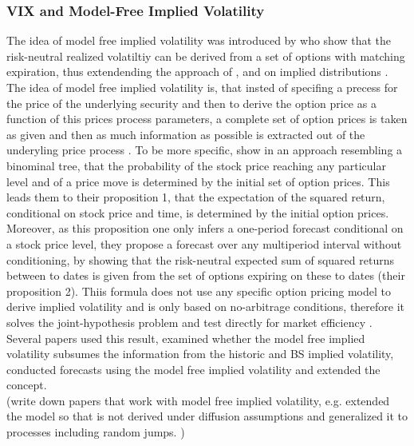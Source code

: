 \subsubsection{VIX and Model-Free Implied Volatility}\label{sec:223VIX}
The idea of model free implied volatility was introduced by \textcite{britten2000} who show that the risk-neutral realized volatiltiy can be derived from a set of options with matching expiration, thus extendending the approach of \textcite{derman1994} \textcite{dupire1994}, \textcite{dupire1997} and \textcite{rubinstein1994} on implied distributions \parencite{jiang2003}. The idea of model free implied volatility is, that insted of specifing a precess for the price of the underlying security and then to derive the option price as a function of this prices process parameters,  a complete set of option prices is taken as given and then as much information as possible is extracted out of the underyling price process \parencite{britten2000}. To be more specific, \textcite{britten2000} show in an approach resembling a binominal tree, that the probability of the stock price reaching any particular level and of a price move is determined by the initial set of option prices. This leads them to their proposition 1, that the expectation of the squared return, conditional on stock price and time, is determined by the initial option prices. Moreover, as this proposition one only infers a one-period forecast conditional on a stock price level, they propose a forecast over any multiperiod interval without conditioning, by showing that the risk-neutral expected sum of squared returns between to dates is given from the set of options expiring on these to dates (their proposition 2). Thiis formula does not use any specific option pricing model to derive implied volatility and is only based on no-arbitrage conditions, therefore it solves the joint-hypothesis problem and test directly for market efficiency \parencite{jiang2003}.  \\
Several papers used this result, examined whether the model free implied volatility subsumes the information from the historic and \gls{BS} implied volatility, conducted forecasts using the model free implied volatility and extended the concept.\\
(write down papers that work with model free implied volatility, e.g. \citeauthor{jiang2003} extended the model so that is not derived under diffusion assumptions and generalized it to processes including random jumps. )\\
